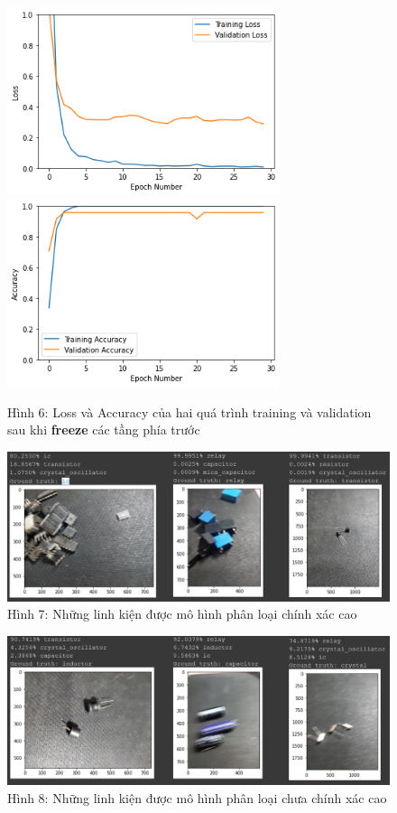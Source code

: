 \documentclass[a4paper]{article}
\begin{document}
\begin{figure}[h!]
\centering
{{\includegraphics[width=8cm]{images/loss1.png} }}
\qquad
{{\includegraphics[width=8cm]{images/acc1.png} }}
\caption*{Hình 6: Loss và Accuracy của hai quá trình training và validation sau khi \textbf{freeze} các tầng phía trước}
\end{figure}

\clearpage

\begin{figure}[h!]
\centering
\includegraphics[width=15cm]{images/result1.PNG}
\caption*{Hình 7: Những linh kiện được mô hình phân loại chính xác cao}
\end{figure}

\begin{figure}[h!]
\centering
\includegraphics[width=15cm]{images/result2.PNG}
\caption*{Hình 8: Những linh kiện được mô hình phân loại chưa chính xác cao}
\end{figure}
\end{document}
